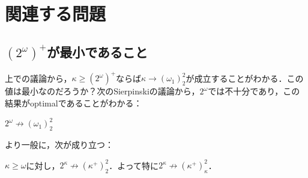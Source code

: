 \documentclass[a4j,lualatex,ja=standard]{bxjsarticle}
\begin{document}
\section{関連する問題}
\subsection{$(2^\omega)^+$が最小であること}
上での議論から，$\kappa \geq (2^\omega)^+$ならば$\kappa \longrightarrow (\omega_1)^2_2$が成立することがわかる．この値は最小なのだろうか？次のSierpinskiの議論から，$2^\omega$では不十分であり，この結果がoptimalであることがわかる：
\begin{lemma}[Sierpinski]
 $2^\omega \nrightarrow (\omega_1)^2_2$
\end{lemma}
より一般に，次が成り立つ：
\begin{lemma}[Sierpinski]
 $\kappa \geq \omega$に対し，$2^\kappa \nrightarrow (\kappa^+)^2_2$．よって特に$2^\kappa \nrightarrow (\kappa^+)^2_\kappa$．
\end{lemma}
\end{document}

